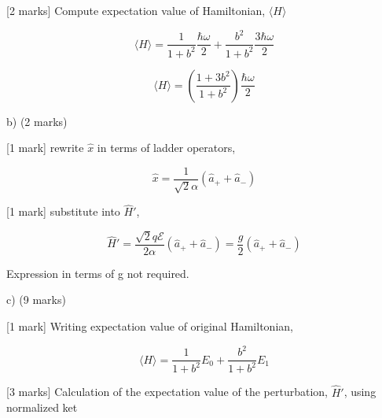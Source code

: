 [2 marks] Compute expectation value of Hamiltonian, \( \langle H \rangle \) 

\[ \langle H \rangle = \frac{1}{1+b^2} \frac{\hbar \omega}{2} + \frac{b^2}{1+b^2} \frac{3\hbar \omega}{2} \]

\[ \langle H \rangle = \left ( \frac{1+3b^2}{1+b^2} \right) \frac{\hbar \omega}{2} \]

b) (2 marks)

[1 mark] rewrite \( \hat{x} \) in terms of ladder operators,

\[ \hat{x} = \frac{1}{\sqrt{2} \alpha} (\hat{a}_{+} + \hat{a}_{-}) \]

[1 mark] substitute into \( \hat{H}' \), 

\[ \hat{H}' = \frac{\sqrt{2} q \mathcal{E}}{2 \alpha} (\hat{a}_{+} + \hat{a}_{-}) = \frac{g}{2} (\hat{a}_{+} + \hat{a}_{-}) \]

Expression in terms of g not required. 

c) (9 marks)

[1 mark] Writing expectation value of original Hamiltonian, 

\[ \langle H \rangle = \frac{1}{1+b^2} E_0 + \frac{b^2}{1+b^2} E_1 \]

[3 marks] Calculation of the expectation value of the perturbation, \( \hat{H}' \), using normalized ket

